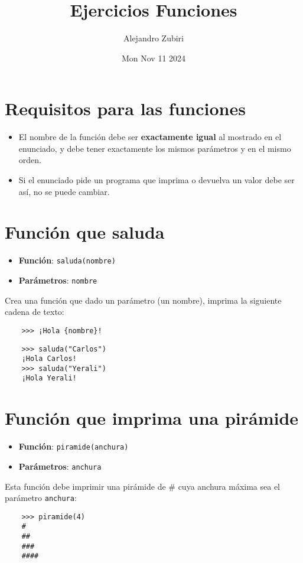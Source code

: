 \documentclass{article}
\author{Alejandro Zubiri}
\date{Mon Nov 11 2024}
\title{Ejercicios Funciones}
\begin{document}
\maketitle
\section*{Requisitos para las funciones}
\begin{itemize}
    \item El nombre de la función debe ser \textbf{exactamente igual} al mostrado en el enunciado,
    y debe tener exactamente los mismos parámetros y en el mismo orden.
    \item Si el enunciado pide un programa que imprima o devuelva un valor debe ser así, no
    se puede cambiar.
\end{itemize}
\pagebreak
\section{Función que saluda}
\begin{itemize}
    \item \textbf{Función}: \verb|saluda(nombre)|
    \item \textbf{Parámetros}: \verb|nombre|
\end{itemize}
Crea una función que dado un parámetro (un nombre), imprima la siguiente cadena de texto:
\begin{verbatim}
    >>> ¡Hola {nombre}!
\end{verbatim}
\begin{verbatim}
    >>> saluda("Carlos")
    ¡Hola Carlos!
    >>> saluda("Yerali")
    ¡Hola Yerali!
\end{verbatim}
\section{Función que imprima una pirámide}
\begin{itemize}
    \item \textbf{Función}: \verb|piramide(anchura)|
    \item \textbf{Parámetros}: \verb|anchura|
\end{itemize}
Esta función debe imprimir una pirámide de \# cuya anchura máxima sea
el parámetro \verb|anchura|:
\begin{verbatim}
    >>> piramide(4)
    #
    ##
    ###
    ####
\end{verbatim}
\pagebreak
\end{document}
